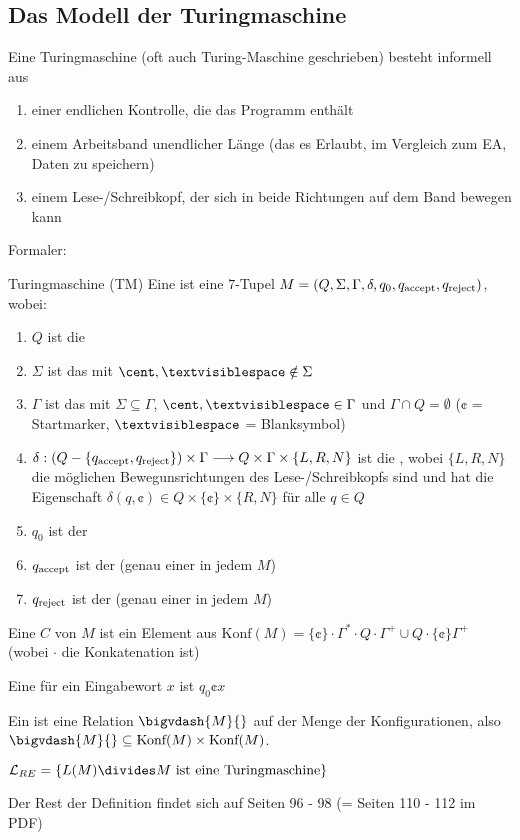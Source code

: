 \subsection{Das Modell der Turingmaschine}
Eine Turingmaschine (oft auch Turing-Maschine geschrieben) besteht informell aus
\begin{enumerate}[label=(\roman*)]
    \item einer endlichen Kontrolle, die das Programm enthält
    \item einem Arbeitsband unendlicher Länge (das es Erlaubt, im Vergleich zum EA, Daten zu speichern)
    \item einem Lese-/Schreibkopf, der sich in beide Richtungen auf dem Band bewegen kann
\end{enumerate}
Formaler:
\begin{definition}[]{Turingmaschine (TM)}
    Eine  ist eine $7$-Tupel $M = (Q, \Sigma, \Gamma, \delta, q_0, q_{\text{accept}}, q_{\text{reject}})$, wobei:
    \begin{enumerate}[label=(\roman*)]
        \item $Q$ ist die 
        \item $\Sigma$ ist das  mit $\cent, \textvisiblespace \notin \Sigma$
        \item $\Gamma$ ist das  mit $\Sigma \subseteq \Gamma$, $\cent, \textvisiblespace \in \Gamma$ und $\Gamma \cap Q = \emptyset$
              ($\cent$ = Startmarker, $\textvisiblespace$ = Blanksymbol)
        \item $\delta : (Q - \{ q_{\text{accept}}, q_{\text{reject}} \}) \times \Gamma \longrightarrow Q \times \Gamma \times \{ L, R, N \}$ ist die ,
              wobei $\{ L, R, N \}$ die möglichen Bewegunsrichtungen des Lese-/Schreibkopfs sind
              und hat die Eigenschaft $\delta(q, \cent) \in Q \times \{ \cent \} \times \{ R, N \}$ für alle $q \in Q$
        \item $q_0$ ist der 
        \item $q_{\text{accept}}$ ist der  (genau einer in jedem $M$)
        \item $q_{\text{reject}}$ ist der  (genau einer in jedem $M$)
    \end{enumerate}
    Eine  $C$ von $M$ ist ein Element aus $\text{Konf}(M) = \{ \cent \} \cdot \Gamma^* \cdot Q \cdot \Gamma^+ \cup Q \cdot \{ \cent \} \Gamma^+$
    (wobei $\cdot$ die Konkatenation ist)

    Eine  für ein Eingabewort $x$ ist $q_0\cent x$

    Ein  ist eine Relation $\bigvdash{M}{}$ auf der Menge der Konfigurationen, also $\bigvdash{M}{} \subseteq \text{Konf}(M) \times \text{Konf}(M)$.

    $\mathcal{L}_{RE} = \{ L(M) \divides M \text{ ist eine Turingmaschine} \}$

    Der Rest der Definition findet sich auf Seiten 96 - 98 (= Seiten 110 - 112 im PDF)
\end{definition}
